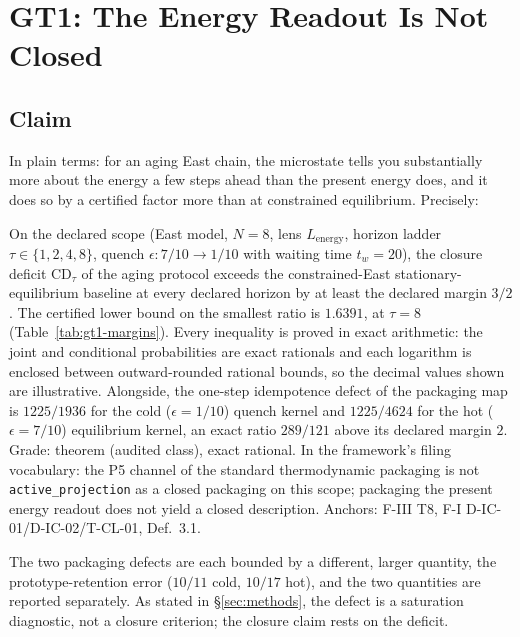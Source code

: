 \section{GT1: The Energy Readout Is Not Closed}
\label{sec:gt1}

\subsection{Claim}

In plain terms: for an aging East chain, the microstate tells you substantially more about the
energy a few steps ahead than the present energy does, and it does so by a certified factor more
than at constrained equilibrium. Precisely:

On the declared scope (East model, $N=8$, lens $L_{\mathrm{energy}}$, horizon ladder
$\tau \in \{1,2,4,8\}$, quench $\epsilon: 7/10 \to 1/10$ with waiting time $t_w = 20$), the
closure deficit $\mathrm{CD}_\tau$ of the aging protocol exceeds the constrained-East
stationary-equilibrium baseline at every declared horizon by at least the declared margin $3/2$.
The certified lower bound on the smallest ratio is $1.6391$, at $\tau=8$
(Table~\ref{tab:gt1-margins}). Every inequality is proved in exact arithmetic: the joint and
conditional probabilities are exact rationals and each logarithm is enclosed between
outward-rounded rational bounds, so the decimal values shown are illustrative. Alongside, the
one-step idempotence defect of the packaging map is $1225/1936$ for the cold ($\epsilon=1/10$)
quench kernel and $1225/4624$ for the hot ($\epsilon=7/10$) equilibrium kernel, an exact ratio
$289/121$ above its declared margin $2$. Grade: theorem (audited class), exact rational. In the
framework's filing vocabulary: the P5 channel of the standard thermodynamic packaging is not
\texttt{active\_projection} as a closed packaging on this scope; packaging the present energy
readout does not yield a closed description. Anchors: F-III T8, F-I D-IC-01/D-IC-02/T-CL-01,
 Def.~3.1.



The two packaging defects are each bounded by a different, larger quantity, the
prototype-retention error ($10/11$ cold, $10/17$ hot), and the two quantities are reported
separately. As stated in \S\ref{sec:methods}, the defect is a saturation diagnostic, not a
closure criterion; the closure claim rests on the deficit.

